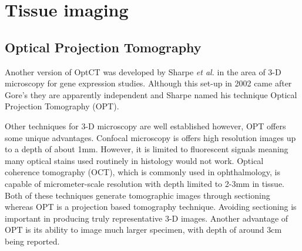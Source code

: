 \documentclass[12pt]{article}
\begin{document}

 









\newpage
\section{Tissue imaging}
\subsection{Optical Projection Tomography}

Another version of OptCT was  developed by Sharpe \textit{et al.} in the area of 3-D microscopy for gene expression studies. \cite{Sharpe:2002jp} Although this set-up in 2002 came after Gore's they are apparently independent and Sharpe named his technique Optical Projection Tomography (OPT).

Other techniques for 3-D microscopy are well established however, OPT offers some unique advantages. 
Confocal microscopy is offers high resolution images up to a depth of about 1mm. \cite{Webb:1996} However, it is limited to fluorescent signals meaning many optical stains used routinely in histology would not work. Optical coherence tomography (OCT), which is commonly used in ophthalmology, is capable of micrometer-scale resolution with  depth limited to 2-3mm in tissue. \cite{huang1993optical} Both of these techniques generate tomographic images through sectioning whereas OPT is a projection based tomography technique. \cite{Sharpe:2003cm} Avoiding sectioning is important in producing truly representative 3-D images. \cite{Oldham:2007ku} Another advantage of  OPT is its ability to  image much larger specimen, with depth of around 3cm being reported. \cite{Oldham:2007ku} 
\end{document}
